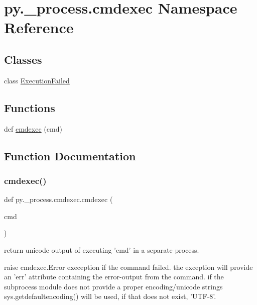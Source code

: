 \hypertarget{namespacepy_1_1__process_1_1cmdexec}{}\section{py.\+\_\+process.\+cmdexec Namespace Reference}
\label{namespacepy_1_1__process_1_1cmdexec}
\subsection*{Classes}
\begin{DoxyCompactItemize}
\item 
class \hyperlink{classpy_1_1__process_1_1cmdexec_1_1_execution_failed}{Execution\+Failed}
\end{DoxyCompactItemize}
\subsection*{Functions}
\begin{DoxyCompactItemize}
\item 
def \hyperlink{namespacepy_1_1__process_1_1cmdexec_a494b1b8f9061babc5eaa0f733721d0e9}{cmdexec} (cmd)
\end{DoxyCompactItemize}


\subsection{Function Documentation}
\mbox{\label{namespacepy_1_1__process_1_1cmdexec_a494b1b8f9061babc5eaa0f733721d0e9}} 
\subsubsection{\texorpdfstring{cmdexec()}{cmdexec()}}
{\footnotesize\ttfamily def py.\+\_\+process.\+cmdexec.\+cmdexec (\begin{DoxyParamCaption}\item[{}]{cmd }\end{DoxyParamCaption})}

\begin{DoxyVerb}return unicode output of executing 'cmd' in a separate process.

raise cmdexec.Error exeception if the command failed.
the exception will provide an 'err' attribute containing
the error-output from the command.
if the subprocess module does not provide a proper encoding/unicode strings
sys.getdefaultencoding() will be used, if that does not exist, 'UTF-8'.
\end{DoxyVerb}
 